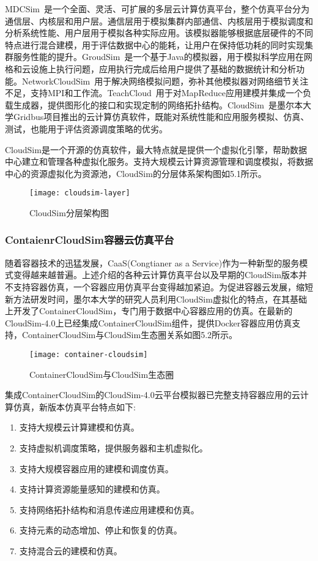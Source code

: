 MDCSim~\cite{Lim2009MDCSim}是一个全面、灵活、可扩展的多层云计算仿真平台，整个仿真平台分为通信层、内核层和用户层。通信层用于模拟集群内部通信、内核层用于模拟调度和分析系统性能、用户层用于模拟各种实际应用。该模拟器能够根据底层硬件的不同特点进行混合建模，用于评估数据中心的能耗，让用户在保持低功耗的同时实现集群服务性能的提升。GroudSim~\cite{Ostermann2011GroudSim}是一个基于Java的模拟器，用于模拟科学应用在网格和云设施上执行问题，应用执行完成后给用户提供了基础的数据统计和分析功能。NetworkCloudSim~\cite{Garg2012NetworkCloudSim}用于解决网络模拟问题，弥补其他模拟器对网络细节关注不足，支持MPI和工作流。TeachCloud~\cite{Jararweh2013TeachCloud}用于对MapReduce应用建模并集成一个负载生成器，提供图形化的接口和实现定制的网络拓扑结构。CloudSim~\cite{Calheiros2009CloudSim}是墨尔本大学Gridbus项目推出的云计算仿真软件，既能对系统性能和应用服务模拟、仿真、测试，也能用于评估资源调度策略的优劣。

CloudSim是一个开源的仿真软件，最大特点就是提供一个虚拟化引擎，帮助数据中心建立和管理各种虚拟化服务。支持大规模云计算资源管理和调度模拟，将数据中心的资源虚拟化为资源池，CloudSim的分层体系架构图如5.1所示。
\begin{figure}[H] %
	\centering
	\texttt{[image: cloudsim-layer]}
	\caption{CloudSim分层架构图~\cite{Calheiros2009CloudSim}}
\end{figure}

\subsubsection{ContaienrCloudSim容器云仿真平台}
随着容器技术的迅猛发展，CaaS(Congtianer as a Service)作为一种新型的服务模式变得越来越普遍。上述介绍的各种云计算仿真平台以及早期的CloudSim版本并不支持容器仿真，一个容器应用仿真平台变得越加紧迫。为促进容器云发展，缩短新方法研发时间，墨尔本大学的研究人员利用CloudSim虚拟化的特点，在其基础上开发了ContainerCloudSim，专门用于数据中心容器应用的仿真。在最新的CloudSim-4.0上已经集成ContainerCloudSim组件，提供Docker容器应用仿真支持，ContainerCloudSim与CloudSim生态圈关系如图5.2所示。
\begin{figure}[H] %
	\centering
	\texttt{[image: container-cloudsim]}
	\caption{ContainerCloudSim与CloudSim生态圈~\cite{Piraghaj2016ContainerCloudSim}}
\end{figure}
集成ContainerCloudSim的CloudSim-4.0云平台模拟器已完整支持容器应用的云计算仿真，新版本仿真平台特点如下:
\begin{enumerate}[(1)]
	\item 支持大规模云计算建模和仿真。
	\item 支持虚拟机调度策略，提供服务器和主机虚拟化。
	\item 支持大规模容器应用的建模和调度仿真。
	\item 支持计算资源能量感知的建模和仿真。
	\item 支持网络拓扑结构和消息传递应用建模和仿真。
	\item 支持元素的动态增加、停止和恢复的仿真。
	\item 支持混合云的建模和仿真。
\end{enumerate}

